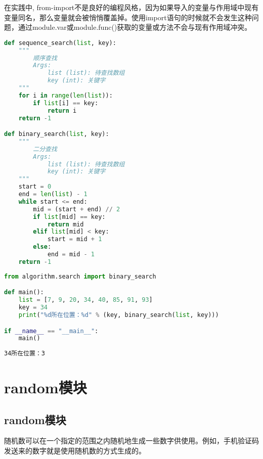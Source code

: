 在实践中, from-import不是良好的编程风格，因为如果导入的变量与作用域中现有变量同名，那么变量就会被悄悄覆盖掉。使用import语句的时候就不会发生这种问题，通过module.var或module.func()获取的变量或方法不会与现有作用域冲突。\\


\begin{lstlisting}[language=Python, title=algorithm/search.py]
def sequence_search(list, key):
    """
        顺序查找
        Args:
            list (list): 待查找数组
            key (int): 关键字
    """
    for i in range(len(list)):
        if list[i] == key:
            return i
    return -1

def binary_search(list, key):
    """
        二分查找
        Args:
            list (list): 待查找数组
            key (int): 关键字
    """
    start = 0
    end = len(list) - 1
    while start <= end:
        mid = (start + end) // 2
        if list[mid] == key:
            return mid
        elif list[mid] < key:
            start = mid + 1
        else:
            end = mid - 1
    return -1
\end{lstlisting}

\begin{lstlisting}[language=Python, title=from\_import.py]
from algorithm.search import binary_search

def main():
    list = [7, 9, 20, 34, 40, 85, 91, 93]
    key = 34
    print("%d所在位置：%d" % (key, binary_search(list, key)))

if __name__ == "__main__":
    main()
\end{lstlisting}

\begin{tcolorbox}
	\begin{verbatim}
34所在位置：3
\end{verbatim}
\end{tcolorbox}

\newpage

\section{random模块}

\subsection{random模块}

随机数可以在一个指定的范围之内随机地生成一些数字供使用。例如，手机验证码发送来的数字就是使用随机数的方式生成的。

